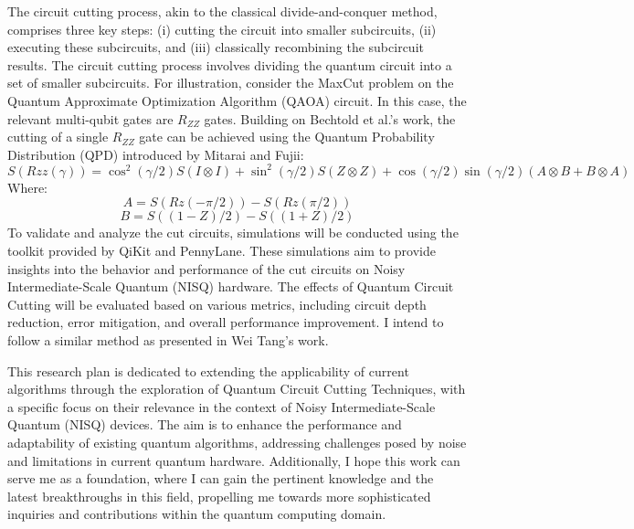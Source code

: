 \documentclass[]{article}
\begin{document}
The circuit cutting process, akin to the classical divide-and-conquer method, comprises three key steps: (i) cutting the circuit into smaller subcircuits, (ii) executing these subcircuits, and (iii) classically recombining the subcircuit results. The circuit cutting process involves dividing the quantum circuit into a set of smaller subcircuits. For illustration, consider the MaxCut problem on the Quantum Approximate Optimization Algorithm (QAOA) circuit. In this case, the relevant multi-qubit gates are $R_{ZZ}$ gates. Building on Bechtold et al.'s work\cite{Bechtold_2023}, the cutting of a single $R_{ZZ}$ gate can be achieved using the Quantum Probability Distribution (QPD) introduced by Mitarai and Fujii\cite{Mitarai_2021}:
$$S(Rzz(\gamma)) = \cos^2(\gamma/2) S(I \otimes I) + \sin^2(\gamma/2) S(Z \otimes Z) + \cos(\gamma/2) \sin(\gamma/2)(A \otimes B + B \otimes A)$$
Where:
$$A = S(Rz(-\pi/2)) - S(Rz(\pi/2))$$
$$B = S((1-Z)/2) - S((1+Z)/2)$$
To validate and analyze the cut circuits, simulations will be conducted using the toolkit provided by QiKit and PennyLane. These simulations aim to provide insights into the behavior and performance of the cut circuits on Noisy Intermediate-Scale Quantum (NISQ) hardware. The effects of Quantum Circuit Cutting will be evaluated based on various metrics, including circuit depth reduction, error mitigation, and overall performance improvement. I intend to follow a similar method as presented in Wei Tang's work\cite{CutQC}.

This research plan is dedicated to extending the applicability of current algorithms through the exploration of Quantum Circuit Cutting Techniques, with a specific focus on their relevance in the context of Noisy Intermediate-Scale Quantum (NISQ) devices. The aim is to enhance the performance and adaptability of existing quantum algorithms, addressing challenges posed by noise and limitations in current quantum hardware. Additionally, I hope this work can serve me as a foundation, where I can gain the pertinent knowledge and the latest breakthroughs in this field, propelling me towards more sophisticated inquiries and contributions within the quantum computing domain.



\end{document}
